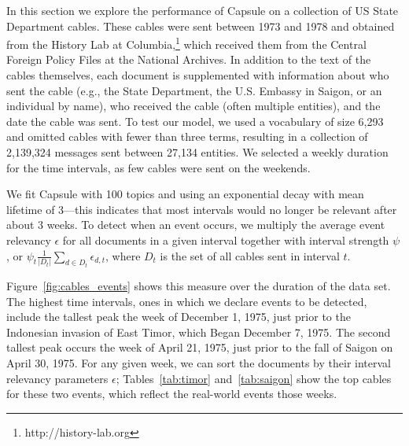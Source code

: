 
In this section we explore the performance of Capsule on a collection of US State Department cables.
These cables were sent between 1973 and 1978 and obtained from the History Lab at Columbia,\footnote{http://history-lab.org} which received them from the Central Foreign Policy Files at the National Archives. In addition to the text of the cables themselves, each document is supplemented with information about who sent the cable (e.g., the State Department, the U.S. Embassy in Saigon, or an individual by name), who received the cable (often multiple entities), and the date the cable was sent.  To test our model, we used a vocabulary of size 6,293 and omitted cables with fewer than three terms, resulting in a collection of 2,139,324 messages sent between 27,134 entities.  We selected a weekly duration for the time intervals, as few cables were sent on the weekends.

We fit Capsule with 100 topics and using an exponential decay with mean lifetime of 3---this indicates that most intervals would no longer be relevant after about 3 weeks.  To detect when an event occurs, we multiply the average event relevancy $\epsilon$ for all documents in a given interval together with interval strength $\psi$, or  $\psi_t \frac{1}{\vert D_t \vert}\sum_{d\in D_t} \epsilon_{d,t}$, where $D_t$ is the set of all cables sent in interval $t$.

Figure~\ref{fig:cables_events} shows this measure over the duration of the data set. The highest time intervals, ones in which we declare events to be detected, include the tallest peak the week of December 1, 1975, just prior to the Indonesian invasion of East Timor, which Began December 7, 1975.  The second tallest peak occurs the week of April 21, 1975, just prior to the fall of Saigon on April 30, 1975.  For any given week, we can sort the documents by their interval relevancy parameters $\epsilon$; Tables~\ref{tab:timor} and~\ref{tab:saigon} show the top cables for these two events, which reflect the real-world events those weeks.


